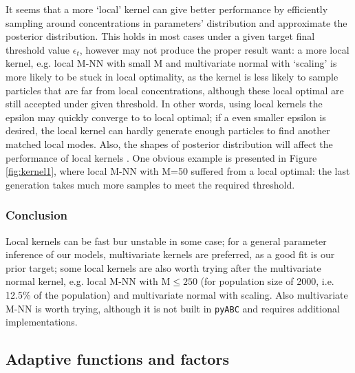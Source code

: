 \documentclass[12pt,a4paper]{report}
\begin{document}
It seems that a more `local' kernel can give better performance by efficiently sampling around concentrations in parameters' distribution and approximate the posterior distribution. This holds in most cases under a given target final threshold value $\epsilon_t$, however may not produce the proper result want: a more local kernel, e.g. local M-NN with small M and multivariate normal with `scaling' is more likely to be stuck in local optimality, as the kernel is less likely to sample particles that are far from local concentrations, although these local optimal are still accepted under given threshold. In other words, using local kernels the epsilon may quickly converge to to local optimal; if a even smaller epsilon is desired, the local kernel can hardly generate enough particles to find another matched local modes. Also, the shapes of posterior distribution will affect the performance of local kernels \cite{ref:kernel}. One obvious example is presented in Figure \ref{fig:kernel1}, where local M-NN with M=50 suffered from a local optimal: the last generation takes much more samples to meet the required threshold.

\subsubsection{Conclusion} Local kernels can be fast bur unstable in some case; for a general parameter inference of our models, multivariate kernels are preferred, as a good fit is our prior target; some local kernels are also worth trying after the multivariate normal kernel, e.g. local M-NN with M$\leq 250$ (for population size of 2000, i.e. 12.5\% of the population) and multivariate normal with scaling. Also multivariate M-NN is worth trying, although it is not built in \verb|pyABC| and requires additional implementations.


    
    


\subsection{Adaptive functions and factors}
\end{document}
